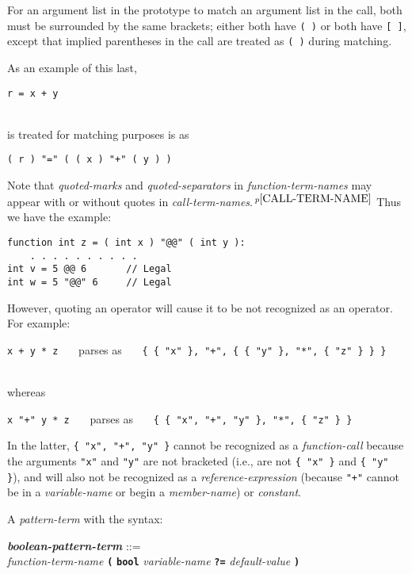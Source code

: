 \documentclass[12pt]{article}
\newcommand{\TT}[1]{{\tt \bfseries #1}}
\newcommand{\emkey}[1]{{\em \bfseries #1}}
\newcommand{\pagnote}[1]{$\,^{p\pageref{#1}}$}
\newenvironment{indpar}[1][0.3in]%
	{\begin{list}{}%
		     {\setlength{\itemsep}{0in}%
		      \setlength{\topsep}{0in}%
		      \setlength{\parsep}{1ex}%
		      \setlength{\labelwidth}{#1}%
		      \setlength{\leftmargin}{#1}%
		      \addtolength{\leftmargin}{\labelsep}}%
	 \item}%
	{\end{list}}
\begin{document}
For an argument
list in the prototype to match an argument list in the call, both
must be surrounded by the same brackets; either both have {\tt (~)}
or both have {\tt [~]}, except that implied parentheses in the
call are treated as {\tt (~)} during matching.

As an example of this last,
\\[0.5ex]
\centerline{
{\tt r = x + y}
}
\\
is treated for matching purposes is as
\\[1ex]
\centerline{
{\tt ( r ) "=" ( ( x ) "+" ( y ) )}
}

Note that {\em quoted-marks} and {\em quoted-separators}
in {\em function-term-names} may appear with or without quotes in
{\em call-term-names}.\pagnote{CALL-TERM-NAME}  Thus we have the example:
\begin{indpar}\begin{verbatim}
function int z = ( int x ) "@@" ( int y ):
    . . . . . . . . . .
int v = 5 @@ 6       // Legal
int w = 5 "@@" 6     // Legal
\end{verbatim}\end{indpar}

However, quoting an operator will cause it to be not recognized as
an operator.  For example:
\\[0.5ex]
\centerline{
{\tt x + y * z}
~~~parses as~~~
{\tt \{ \{ "x" \}, "+", \{ \{ "y" \}, "*", \{ "z" \} \} \}} \\
} \\
whereas \\
\centerline{
{\tt x "+" y * z}
~~~parses as~~~
{\tt \{ \{ "x", "+", "y" \}, "*", \{ "z" \} \}}
}
In the latter, {\tt \{ "x", "+", "y" \}} cannot be recognized as
a {\em function-call} because the arguments {\tt "x"} and {\tt "y"} are
not bracketed (i.e., are not {\tt \{ "x" \}} and {\tt \{ "y" \}}),
and will also not be recognized as a {\em reference-expression}
(because {\tt "+"} cannot be in a {\em variable-name} or
begin a {\em member-name}) or
{\em constant}.

A {\em pattern-term} with the syntax:
\begin{indpar}
\emkey{boolean-pattern-term}\label{BOOLEAN-PATTERN-TERM} ::= \\
\hspace*{1in} {\em function-term-name} \TT{(}
        \TT{bool} {\em variable-name}
	\TT{?=} {\em default-value} \TT{)}
\end{indpar}
\end{document}
